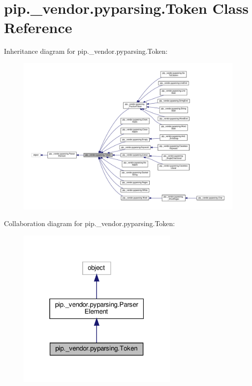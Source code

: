 \hypertarget{classpip_1_1__vendor_1_1pyparsing_1_1Token}{}\section{pip.\+\_\+vendor.\+pyparsing.\+Token Class Reference}
\label{classpip_1_1__vendor_1_1pyparsing_1_1Token}


Inheritance diagram for pip.\+\_\+vendor.\+pyparsing.\+Token\+:
\nopagebreak
\begin{figure}[H]
\begin{center}
\leavevmode
\includegraphics[width=350pt]{classpip_1_1__vendor_1_1pyparsing_1_1Token__inherit__graph}
\end{center}
\end{figure}


Collaboration diagram for pip.\+\_\+vendor.\+pyparsing.\+Token\+:
\nopagebreak
\begin{figure}[H]
\begin{center}
\leavevmode
\includegraphics[width=223pt]{classpip_1_1__vendor_1_1pyparsing_1_1Token__coll__graph}
\end{center}
\end{figure}

